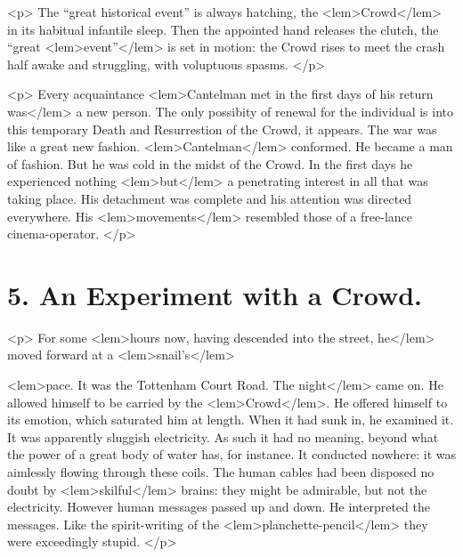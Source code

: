 {{				<p>
					The “great historical event” is always hatching, the 
<lem>Crowd</lem>{} in its habitual infantile 
					sleep. Then the appointed hand releases the clutch, the “great 
<lem>event”</lem>
						{} 
					is set in 
					motion: the Crowd rises to meet the crash half awake and struggling, with voluptuous 
					spasms. 
 				</p>

				<p>
					Every acquaintance 
<lem>Cantelman met in the first days of his return was</lem>
						{} 
					a new person. The only possibity of renewal 
					for the individual is into this temporary Death and Resurrestion of the Crowd, it  
					appears. The war was like a great new fashion. 
<lem>Cantelman</lem>
						{} 
					conformed. He became a 
					man of fashion. But he was cold in the midst of the Crowd. In the first days he 
					experienced nothing 
<lem>but</lem>
						{} 
					a penetrating interest in all that was taking place. His 
					detachment was complete and his attention was directed everywhere. His 
<lem>movements</lem>
						{} 
					resembled those of a free-lance cinema-operator. 
				</p>

\newpage %

	\section*{5. An Experiment with a Crowd.}

				<p>
					For some 
<lem>hours now, having descended into the street, he</lem>
						{} 
					moved forward at a 
<lem>snail's</lem>
						{} 
					
<lem>pace. It was the Tottenham Court Road. The night</lem>
						{} 
					came on. He allowed 
					himself to be carried by the 
<lem>Crowd</lem>{}. He offered himself to its emotion, which 
					saturated him at length. When it had sunk in, he examined it. It was apparently 
					sluggish electricity. As such it had no meaning, beyond what the power of a great 
					body of water has, for instance. It conducted nowhere: it was aimlessly flowing 
					through these coils. The human cables had been disposed no doubt by 
<lem>skilful</lem>
						{} 
					brains: 
					they might be admirable, but not the electricity. However human messages passed up 
					and down. He interpreted the messages. Like the spirit-writing of the 
<lem>planchette-pencil</lem>
						{} 
					they were exceedingly stupid. 
 				</p>

}}
